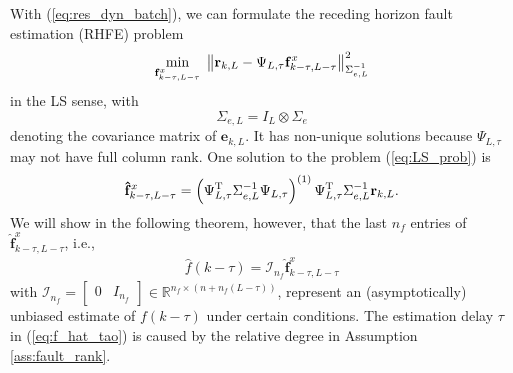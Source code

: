 \documentclass[twocolumn]{autart}
\begin{document}
With (\ref{eq:res_dyn_batch}), we can formulate the receding horizon fault estimation (RHFE) problem
\begin{equation}\label{eq:LS_prob}
\mathop {\min }\limits_{{{\mathbf{{{f}}}}_{k-\tau,L-\tau}^x}} \;\left\| {{{\bf{r}}_{k,L}} - \Psi_{L,\tau}
\mathbf{{{f}}}_{k-\tau,L-\tau}^x } \right\|_{\Sigma_{e,L}^{-1}}^2
\end{equation}
in the LS sense, with
\begin{equation}\label{eq:Sigma_eL}
\Sigma_{e,L} = I_L \otimes \Sigma_e
\end{equation}
denoting the covariance matrix of $\mathbf{e}_{k,L}$.
It has non-unique solutions because $\Psi_{L,\tau}$ may not have full column rank. One solution to the problem (\ref{eq:LS_prob}) is
\begin{equation}\label{eq:fkL_hat}
{{\mathbf{\hat {{f}}}}_{k-\tau,L-\tau}^x} = \left( \Psi_{L,\tau}^\mathrm{T} \Sigma_{e,L}^{-1} \Psi_{L,\tau} \right)^{(1)}
\Psi_{L,\tau}^\mathrm{T} \Sigma_{e,L}^{-1} {{\bf{r}}_{k,L}}.
\end{equation}
We will show in the following theorem, however, that the last $n_f$ entries of ${{\mathbf{\hat {{f}}}}_{k-\tau,L-\tau}^x}$, i.e.,
\begin{equation}\label{eq:f_hat_tao}
\begin{aligned}
\hat f \left( k - \tau \right) = \mathcal{I}_{n_f} {{\mathbf{\hat {{f}}}}_{k-\tau,L-\tau}^x}
\end{aligned}
\end{equation}
with $\mathcal{I}_{n_f} = [ \begin{array}{cc}
                        0 & I_{n_f}
                      \end{array}] \in \mathbb{R}^{n_f \times \left( n + n_f \left( L - \tau \right) \right)}$, 
represent an (asymptotically) unbiased estimate of $f \left( k - \tau \right)$ under certain conditions. The estimation delay $\tau$ in (\ref{eq:f_hat_tao}) is caused by the relative degree in Assumption \ref{ass:fault_rank}.
\end{document}
